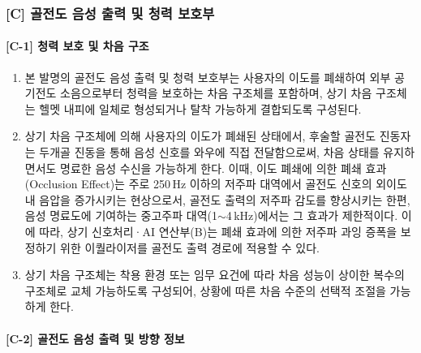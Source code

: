 \documentclass{article}
\begin{document}
\subsubsection{[C] 골전도 음성 출력 및 청력 보호부}

\paragraph{[C-1] 청력 보호 및 차음 구조}

\begin{enumerate}[label = \textbf{(C.1.\arabic*)}]

    \item 본 발명의 골전도 음성 출력 및 청력 보호부는 사용자의 이도를 폐쇄하여 외부 공기전도 소음으로부터 청력을 보호하는 차음 구조체를 포함하며, 상기 차음 구조체는 헬멧 내피에 일체로 형성되거나 탈착 가능하게 결합되도록 구성된다.

    \item 상기 차음 구조체에 의해 사용자의 이도가 폐쇄된 상태에서, 후술할 골전도 진동자는 두개골 진동을 통해 음성 신호를 와우에 직접 전달함으로써, 차음 상태를 유지하면서도 명료한 음성 수신을 가능하게 한다. 이때, 이도 폐쇄에 의한 폐쇄 효과(Occlusion Effect)는 주로 250\,Hz 이하의 저주파 대역에서 골전도 신호의 외이도 내 음압을 증가시키는 현상으로서, 골전도 출력의 저주파 감도를 향상시키는 한편, 음성 명료도에 기여하는 중고주파 대역(1$\sim$4\,kHz)에서는 그 효과가 제한적이다. 이에 따라, 상기 신호처리·AI 연산부(B)는 폐쇄 효과에 의한 저주파 과잉 증폭을 보정하기 위한 이퀄라이저를 골전도 출력 경로에 적용할 수 있다.

    \item 상기 차음 구조체는 착용 환경 또는 임무 요건에 따라 차음 성능이 상이한 복수의 구조체로 교체 가능하도록 구성되어, 상황에 따른 차음 수준의 선택적 조절을 가능하게 한다.
\end{enumerate}


\paragraph{[C-2] 골전도 음성 출력 및 방향 정보}
\end{document}

